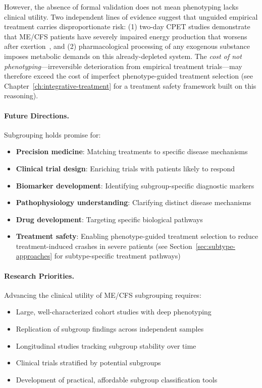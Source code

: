 However, the absence of formal validation does not mean phenotyping lacks clinical utility. Two independent lines of evidence suggest that unguided empirical treatment carries disproportionate risk: (1) two-day CPET studies demonstrate that ME/CFS patients have severely impaired energy production that worsens after exertion~\cite{keller2024cpet,VanCampen2020SeverityCPET}, and (2) pharmacological processing of any exogenous substance imposes metabolic demands on this already-depleted system. The \textit{cost of not phenotyping}---irreversible deterioration from empirical treatment trials---may therefore exceed the cost of imperfect phenotype-guided treatment selection (see Chapter~\ref{ch:integrative-treatment} for a treatment safety framework built on this reasoning).

\paragraph{Future Directions.}
Subgrouping holds promise for:
\begin{itemize}
    \item \textbf{Precision medicine}: Matching treatments to specific disease mechanisms
    \item \textbf{Clinical trial design}: Enriching trials with patients likely to respond
    \item \textbf{Biomarker development}: Identifying subgroup-specific diagnostic markers
    \item \textbf{Pathophysiology understanding}: Clarifying distinct disease mechanisms
    \item \textbf{Drug development}: Targeting specific biological pathways
    \item \textbf{Treatment safety}: Enabling phenotype-guided treatment selection to reduce treatment-induced crashes in severe patients (see Section~\ref{sec:subtype-approaches} for subtype-specific treatment pathways)
\end{itemize}

\paragraph{Research Priorities.}
Advancing the clinical utility of ME/CFS subgrouping requires:
\begin{itemize}
    \item Large, well-characterized cohort studies with deep phenotyping
    \item Replication of subgroup findings across independent samples
    \item Longitudinal studies tracking subgroup stability over time
    \item Clinical trials stratified by potential subgroups
    \item Development of practical, affordable subgroup classification tools
\end{itemize}

